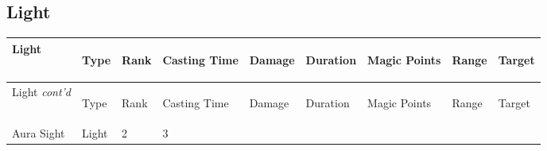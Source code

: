 \documentclass[twoside]{book}
\begin{document}
    

\subsection{Light}
    
\begin{longtable}{p{1.25in}lp{2em}p{3em}llp{7em}ll} 
  Light& \begin{turn}{70}{Type}\end{turn}
          & \begin{turn}{70}{Rank}\end{turn}
          & \begin{turn}{70}{Casting Time}\end{turn}
          & \begin{turn}{70}{Damage}\end{turn}
          & \begin{turn}{70}{Duration}\end{turn}
          & \begin{turn}{70}{Magic Points}\end{turn}
          & \begin{turn}{70}{Range}\end{turn}
          & \begin{turn}{70}{Target}\end{turn}
          \\
  \hline
  \hline
  \endfirsthead
  Light \textit{cont'd}
        & \begin{turn}{70}{Type}\end{turn}
          & \begin{turn}{70}{Rank}\end{turn}
          & \begin{turn}{70}{Casting Time}\end{turn}
          & \begin{turn}{70}{Damage}\end{turn}
          & \begin{turn}{70}{Duration}\end{turn}
          & \begin{turn}{70}{Magic Points}\end{turn}
          & \begin{turn}{70}{Range}\end{turn}
          & \begin{turn}{70}{Target}\end{turn}
           \\
  \hline
  \endhead
\raggedright Aura Sight & Light & 2 & 3

\end{longtable}
\end{document}
